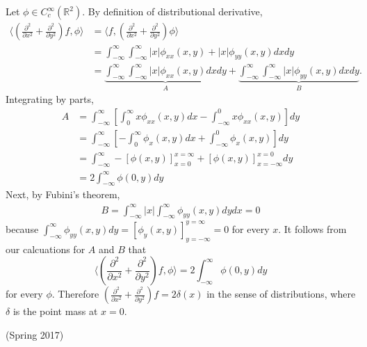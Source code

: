 \documentclass{exam}
\theoremstyle{problemstyle}
\newcommand{\1}[1]{\textbf{1}_{\left[#1\right]}} %
\def\R{\mathbb{R}} %
\begin{document}
\begin{questions}
\begin{solution}
  Let $\phi\in C_{c}^{\infty}(\R^{2})$. By definition of distributional derivative, 
  \begin{align*}
    \Big\langle  \left( \frac{\partial ^{2}}{\partial x^{2}}+ \frac{\partial ^{2}}{\partial y^{2}} \right)f, \phi\Big\rangle
    &= \Big\langle f, \left(\frac{\partial ^{2}}{\partial x^{2}}+ \frac{\partial ^{2}}{\partial y^{2}} \right) \phi \Big\rangle\\ 
    &= \int_{-\infty}^{\infty}\int_{-\infty}^{\infty}|x| \phi_{xx}(x,y)+ |x|\phi_{yy}(x,y)dxdy\\
    &= \underbrace{\int_{-\infty}^{\infty}\int_{-\infty}^{\infty}|x| \phi_{xx}(x,y)dxdy}_{A}+ \underbrace{\int_{-\infty}^{\infty}\int_{-\infty}^{\infty}|x|\phi_{yy}(x,y)dxdy}_{B}.
  \end{align*}
  Integrating by parts,
  \begin{align*}
    A&= \int_{-\infty}^{\infty}\left[\int_{0}^{\infty}x \phi_{xx}(x,y)dx - \int_{-\infty}^{0}x\phi_{xx}(x,y)\right]dy\\
     &= \int_{-\infty}^{\infty}\left[-\int_{0}^{\infty}\phi_{x}(x,y)dx + \int_{-\infty}^{0}\phi_{x}(x,y)\right]dy\\
     &= \int_{-\infty}^{\infty} -\left[ \phi(x,y) \right]^{x=\infty}_{x=0}+ \left[ \phi(x,y) \right]^{x=0}_{x=-\infty}dy\\
     &=2\int_{-\infty}^{\infty}\phi(0,y)dy
  \end{align*}
  Next, by Fubini's theorem,
  \begin{align*}
    B= \int_{-\infty}^{\infty}|x|\int_{-\infty}^{\infty}\phi_{yy}(x,y)dydx = 0
  \end{align*}
  because $\int_{-\infty}^{\infty}\phi_{yy}(x,y)dy = \left[ \phi_{y}(x,y) \right]^{y=\infty}_{y=-\infty}= 0$ for every $x$. It follows from our calcuations for $A$ and $B$ that
  \begin{equation*}
    \Big\langle  \left( \frac{\partial ^{2}}{\partial x^{2}}+ \frac{\partial ^{2}}{\partial y^{2}} \right)f, \phi\Big\rangle = 2\int_{-\infty}^{\infty}\phi(0,y)dy
  \end{equation*}
  for every $\phi$. Therefore $\left( \frac{\partial ^{2}}{\partial x^{2}}+ \frac{\partial ^{2}}{\partial y^{2}} \right)f= 2\delta(x)$ in the sense of distributions, where $\delta$ is the point mass at $x=0$.
\end{solution} 


\question (Spring 2017)
\begin{parts}

\end{parts}
\end{questions}
\end{document}
